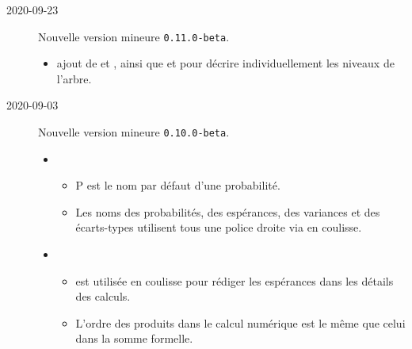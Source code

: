 \documentclass[12pt,a4paper]{article}
\begin{document}
\begin{description}

    \medskip
    \item[2020-09-23] Nouvelle version mineure \verb+0.11.0-beta+.
    
    \begin{itemize}[itemsep=.5em]
        \item {}
        	  ajout de  et , ainsi que  et  pour décrire individuellement les niveaux de l'arbre.
    \end{itemize}
    
    
    \separation


    \medskip
    \item[2020-09-03] Nouvelle version mineure \verb+0.10.0-beta+.
    
    \begin{itemize}[itemsep=.5em]
        \item {}
    
        \begin{itemize}[itemsep=.5em]
            \item $\mathrm{P}$ est le nom par défaut d'une probabilité.
    
    		\item Les noms des probabilités, des espérances, des variances et des écarts-types utilisent tous une police droite via  en coulisse.
        \end{itemize}
    
    
    
    
        \item {}
    
        \begin{itemize}[itemsep=.5em]
            \item {} est utilisée en coulisse pour rédiger les espérances dans les détails des calculs.
            
    		\item L'ordre des produits dans le calcul numérique est le même que celui dans la somme formelle.
        \end{itemize}
    \end{itemize}
    
    
    \separation
    



\end{description}
\end{document}
